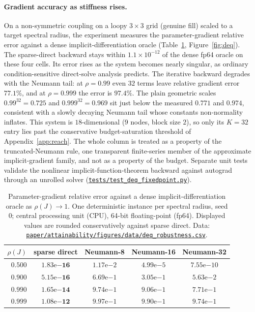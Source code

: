 \paragraph{Gradient accuracy as stiffness rises.}
On a non-symmetric coupling on a loopy $3\times3$ grid (genuine fill) scaled
to a target spectral radius, the experiment measures the parameter-gradient relative error
against a dense implicit-differentiation oracle (Table~\ref{tab:deq},
Figure~\ref{fig:deq}). The sparse-direct backward stays within
$1.1\times10^{-12}$ of the dense fp64 oracle on these four cells. Its error
rises as the system becomes nearly singular, as ordinary condition-sensitive
direct-solve analysis predicts. The iterative
backward degrades with the Neumann tail: at $\rho=0.99$ even $32$ terms leave
relative gradient error $77.1\%$, and at $\rho=0.999$ the error is $97.4\%$.
The plain geometric scales $0.99^{32}=0.725$ and $0.999^{32}=0.969$ sit just
below the measured $0.771$ and $0.974$, consistent with a slowly decaying
Neumann tail whose constants non-normality inflates. This system is $18$-dimensional ($9$ nodes, block size $2$), so only
its $K=32$ entry lies past the conservative budget-saturation threshold of
Appendix~\ref{app:reach}. The whole column is treated as a property of the
truncated-Neumann rule, one transparent finite-series member of the
approximate implicit-gradient family, and not as a property of the budget. Separate unit tests validate the
nonlinear
implicit-function-theorem backward against autograd through an unrolled solver
(\href{https://github.com/vanshsehrawat14/gabp-sparse-inv/blob/main/tests/test_deq_fixedpoint.py}
{\nolinkurl{tests/test_deq_fixedpoint.py}}).

\begin{table}[htbp]
  \centering
  \caption{Parameter-gradient relative error against a dense
  implicit-differentiation oracle as $\rho(J)\to1$. One deterministic instance
  per spectral radius, seed 0; central processing unit (CPU), 64-bit
  floating-point (fp64). Displayed values are rounded
  conservatively against sparse direct. Data:
  \href{https://github.com/vanshsehrawat14/gabp-sparse-inv/blob/main/paper/attainability/figures/data/deq_robustness.csv}
{\nolinkurl{paper/attainability/figures/data/deq_robustness.csv}}.}
  \label{tab:deq}
  \begin{tabular}{rcccc}
    \toprule
    $\rho(J)$ & sparse direct & Neumann-8 & Neumann-16 & Neumann-32 \\
    \midrule
    $0.500$ & $\mathbf{1.83\mathrm{e}{-16}}$ & $1.17\mathrm{e}{-2}$ & $4.99\mathrm{e}{-5}$ & $7.55\mathrm{e}{-10}$ \\
    $0.900$ & $\mathbf{5.15\mathrm{e}{-16}}$ & $6.69\mathrm{e}{-1}$ & $3.05\mathrm{e}{-1}$ & $5.63\mathrm{e}{-2}$ \\
    $0.990$ & $\mathbf{1.65\mathrm{e}{-14}}$ & $9.74\mathrm{e}{-1}$ & $9.06\mathrm{e}{-1}$ & $7.71\mathrm{e}{-1}$ \\
    $0.999$ & $\mathbf{1.08\mathrm{e}{-12}}$ & $9.97\mathrm{e}{-1}$ & $9.90\mathrm{e}{-1}$ & $9.74\mathrm{e}{-1}$ \\
    \bottomrule
  \end{tabular}
\end{table}

